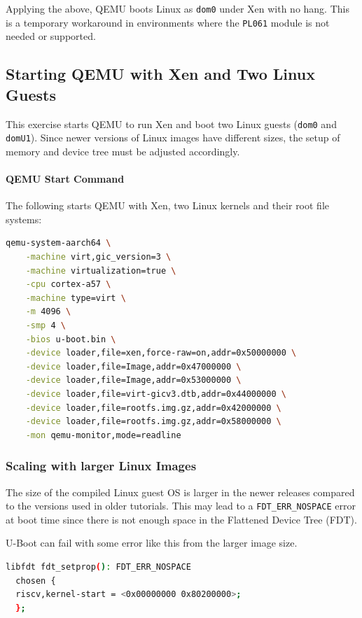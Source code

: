 \documentclass[acmtog]{acmart}
\begin{document}
Applying the above, QEMU boots Linux as \texttt{dom0} under Xen with no hang. This is a temporary workaround in environments where the \texttt{PL061} module is not needed or supported.



\subsection{Starting QEMU with Xen and Two Linux Guests}

This exercise starts QEMU to run Xen and boot two Linux guests (\texttt{dom0} and \texttt{domU1}). Since newer versions of Linux images have different sizes, the setup of memory and device tree must be adjusted accordingly.

\paragraph{QEMU Start Command}

The following starts QEMU with Xen, two Linux kernels and their root file systems:


\begin{lstlisting}[language=bash, caption=Designed Device Layout]
qemu-system-aarch64 \
    -machine virt,gic_version=3 \
    -machine virtualization=true \
    -cpu cortex-a57 \
    -machine type=virt \
    -m 4096 \
    -smp 4 \
    -bios u-boot.bin \
    -device loader,file=xen,force-raw=on,addr=0x50000000 \
    -device loader,file=Image,addr=0x47000000 \
    -device loader,file=Image,addr=0x53000000 \
    -device loader,file=virt-gicv3.dtb,addr=0x44000000 \
    -device loader,file=rootfs.img.gz,addr=0x42000000 \
    -device loader,file=rootfs.img.gz,addr=0x58000000 \
    -mon qemu-monitor,mode=readline
\end{lstlisting}

\subsubsection{Scaling with larger Linux Images}

The size of the compiled Linux guest OS is larger in the newer releases compared to the versions used in older tutorials. This may lead to a \texttt{FDT\_ERR\_NOSPACE} error at boot time since there is not enough space in the Flattened Device Tree (FDT).

U-Boot can fail with some error like this from the larger image size.

\begin{lstlisting}[language=bash, caption=U-Boot error due to different image size]
  libfdt fdt_setprop(): FDT_ERR_NOSPACE
  chosen {
  riscv,kernel-start = <0x00000000 0x80200000>;
  };
\end{lstlisting}
\end{document}
